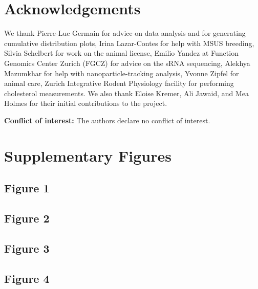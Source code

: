 \documentclass[12pt,twoside]{reedthesis}
\begin{document}
\hypertarget{acknowledgements-1}{%
\section{Acknowledgements}\label{acknowledgements-1}}

We thank Pierre-Luc Germain for advice on data analysis and for
generating cumulative distribution plots, Irina Lazar-Contes for help
with MSUS breeding, Silvia Schelbert for work on the animal license,
Emilio Yandez at Function Genomics Center Zurich (FGCZ) for advice on
the sRNA sequencing, Alekhya Mazumkhar for help with
nanoparticle-tracking analysis, Yvonne Zipfel for animal care, Zurich
Integrative Rodent Physiology facility for performing cholesterol
measurements. We also thank Eloise Kremer, Ali Jawaid, and Mea Holmes
for their initial contributions to the project.

\textbf{Conflict of interest:} The authors declare no conflict of interest.

\newpage

\hypertarget{supplementary-figures-1}{%
\section{Supplementary Figures}\label{supplementary-figures-1}}

\hypertarget{figure-1}{%
\subsection{Figure 1}\label{figure-1}}

\newpage

\hypertarget{figure-2}{%
\subsection{Figure 2}\label{figure-2}}

\newpage

\hypertarget{figure-3}{%
\subsection{Figure 3}\label{figure-3}}

\newpage

\hypertarget{figure-4}{%
\subsection{Figure 4}\label{figure-4}}

\newpage
\end{document}

